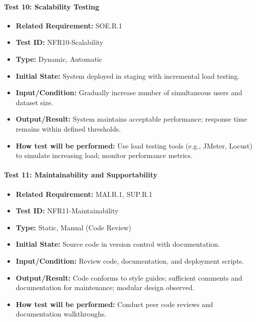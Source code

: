 \documentclass[12pt, titlepage]{article}
\begin{document}
\paragraph{Test 10: Scalability Testing}
\begin{itemize}
    \item \textbf{Related Requirement:} SOE.R.1
    \item \textbf{Test ID:} NFR10-Scalability
    \item \textbf{Type:} Dynamic, Automatic
    \item \textbf{Initial State:} System deployed in staging with incremental load testing.
    \item \textbf{Input/Condition:} Gradually increase number of simultaneous users and dataset size.
    \item \textbf{Output/Result:} System maintains acceptable performance; response time remains within defined thresholds.
    \item \textbf{How test will be performed:} Use load testing tools (e.g., JMeter, Locust) to simulate increasing load; monitor performance metrics.
\end{itemize}

\paragraph{Test 11: Maintainability and Supportability}
\begin{itemize}
    \item \textbf{Related Requirement:} MAI.R.1, SUP.R.1
    \item \textbf{Test ID:} NFR11-Maintainability
    \item \textbf{Type:} Static, Manual (Code Review)
    \item \textbf{Initial State:} Source code in version control with documentation.
    \item \textbf{Input/Condition:} Review code, documentation, and deployment scripts.
    \item \textbf{Output/Result:} Code conforms to style guides; sufficient comments and documentation for maintenance; modular design observed.
    \item \textbf{How test will be performed:} Conduct peer code reviews and documentation walkthroughs.
\end{itemize}
\end{document}
